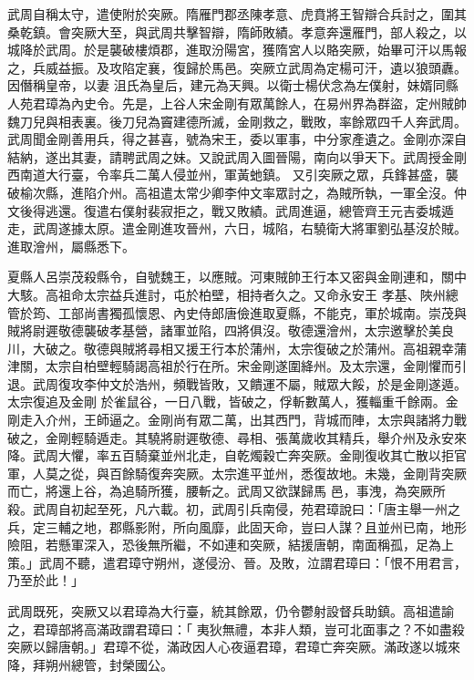 \begin{pinyinscope}
 武周自稱太守，遣使附於突厥。隋雁門郡丞陳孝意、虎賁將王智辯合兵討之，圍其桑乾鎮。會突厥大至，與武周共擊智辯，隋師敗績。孝意奔還雁門，部人殺之，以城降於武周。於是襲破樓煩郡，進取汾陽宮，獲隋宮人以賂突厥，始畢可汗以馬報之，兵威益振。及攻陷定襄，復歸於馬邑。突厥立武周為定楊可汗，遺以狼頭纛。因僭稱皇帝，以妻
 沮氏為皇后，建元為天興。以衛士楊伏念為左僕射，妹婿同縣人苑君璋為內史令。先是，上谷人宋金剛有眾萬餘人，在易州界為群盜，定州賊帥魏刀兒與相表裏。後刀兒為竇建德所滅，金剛救之，戰敗，率餘眾四千人奔武周。武周聞金剛善用兵，得之甚喜，號為宋王，委以軍事，中分家產遺之。金剛亦深自結納，遂出其妻，請聘武周之妹。又說武周入圖晉陽，南向以爭天下。武周授金剛西南道大行臺，令率兵二萬人侵並州，軍黃虵鎮。
 又引突厥之眾，兵鋒甚盛，襲破榆次縣，進陷介州。高祖遣太常少卿李仲文率眾討之，為賊所執，一軍全沒。仲文後得逃還。復遣右僕射裴寂拒之，戰又敗績。武周進逼，總管齊王元吉委城遁走，武周遂據太原。遣金剛進攻晉州，六日，城陷，右驍衛大將軍劉弘基沒於賊。進取澮州，屬縣悉下。



 夏縣人呂崇茂殺縣令，自號魏王，以應賊。河東賊帥王行本又密與金剛連和，關中大駭。高祖命太宗益兵進討，屯於柏壁，相持者久之。又命永安王
 孝基、陜州總管於筠、工部尚書獨孤懷恩、內史侍郎唐儉進取夏縣，不能克，軍於城南。崇茂與賊將尉遲敬德襲破孝基營，諸軍並陷，四將俱沒。敬德還澮州，太宗邀擊於美良川，大破之。敬德與賊將尋相又援王行本於蒲州，太宗復破之於蒲州。高祖親幸蒲津關，太宗自柏壁輕騎謁高祖於行在所。宋金剛遂圍絳州。及太宗還，金剛懼而引退。武周復攻李仲文於浩州，頻戰皆敗，又饋運不屬，賊眾大餒，於是金剛遂遁。太宗復追及金剛
 於雀鼠谷，一日八戰，皆破之，俘斬數萬人，獲輜重千餘兩。金剛走入介州，王師逼之。金剛尚有眾二萬，出其西門，背城而陣，太宗與諸將力戰破之，金剛輕騎遁走。其驍將尉遲敬德、尋相、張萬歲收其精兵，舉介州及永安來降。武周大懼，率五百騎棄並州北走，自乾燭穀亡奔突厥。金剛復收其亡散以拒官軍，人莫之從，與百餘騎復奔突厥。太宗進平並州，悉復故地。未幾，金剛背突厥而亡，將還上谷，為追騎所獲，腰斬之。武周又欲謀歸馬
 邑，事洩，為突厥所殺。武周自初起至死，凡六載。初，武周引兵南侵，苑君璋說曰：「唐主舉一州之兵，定三輔之地，郡縣影附，所向風靡，此固天命，豈曰人謀？且並州已南，地形險阻，若懸軍深入，恐後無所繼，不如連和突厥，結援唐朝，南面稱孤，足為上策。」武周不聽，遣君璋守朔州，遂侵汾、晉。及敗，泣謂君璋曰：「恨不用君言，乃至於此！」



 武周既死，突厥又以君璋為大行臺，統其餘眾，仍令鬱射設督兵助鎮。高祖遣諭之，君璋部將高滿政謂君璋曰：「
 夷狄無禮，本非人類，豈可北面事之？不如盡殺突厥以歸唐朝。」君璋不從，滿政因人心夜逼君璋，君璋亡奔突厥。滿政遂以城來降，拜朔州總管，封榮國公。




\end{pinyinscope}
